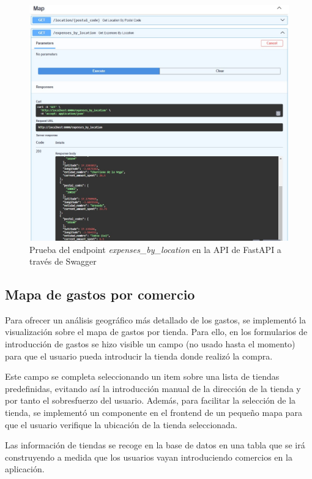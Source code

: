 \begin{figure}[ht!]
    \centering
    \includegraphics[width=\linewidth]{imagenes/api-expenses_by_location.jpg}
    \caption{Prueba del endpoint \textit{expenses\_by\_location} en la API de FastAPI a través de Swagger}
    \label{fig:api-expenses_by_location}
\end{figure}

\subsection{Mapa de gastos por comercio}
Para ofrecer un análisis geográfico más detallado de los gastos, se implementó la visualización sobre el mapa de gastos por tienda. Para ello, en los formularios de introducción de gastos se hizo visible un campo (no usado hasta el momento) para que el usuario pueda introducir la tienda donde realizó la compra. 

Este campo se completa seleccionando un item sobre una lista de tiendas predefinidas, evitando así la introducción manual de la dirección de la tienda y por tanto el sobresfuerzo del usuario. Además, para facilitar la selección de la tienda, se implementó un componente en el frontend de un pequeño mapa para que el usuario verifique la ubicación de la tienda seleccionada.

Las información de tiendas se recoge en la base de datos en una tabla que se irá construyendo a medida que los usuarios vayan introduciendo comercios en la aplicación.


